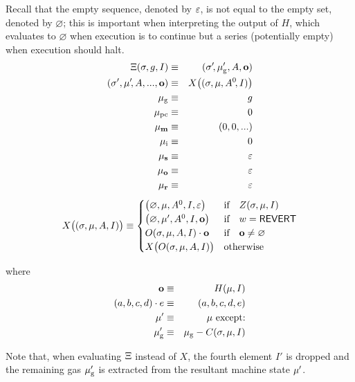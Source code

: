 Recall that the empty sequence, denoted by $\mathbb{\varepsilon}$, is not equal to the empty set, denoted by $\varnothing$; this is important when interpreting the output of $H$, which evaluates to $\varnothing$ when execution is to continue but a series (potentially empty) when execution should halt.
\begin{eqnarray}
\mathrm{\Xi}(\mathbf{\sigma}, g, I) & \equiv & (\mathbf{\sigma}'\!, \mathbf{\mu}'_{\mathrm{g}}, A, \mathbf{o}) \\
(\mathbf{\sigma}', \mathbf{\mu}'\!, A, ..., \mathbf{o}) & \equiv & X\big((\mathbf{\sigma}, \mathbf{\mu}, A^0\!, I)\big) \\
\mathbf{\mu}_{\mathrm{g}} & \equiv & g \\
\mathbf{\mu}_{\mathrm{pc}} & \equiv & 0 \\
\mathbf{\mu}_{\mathbf{m}} & \equiv & (0, 0, ...) \\
\mathbf{\mu}_{\mathrm{i}} & \equiv & 0	\\
\mathbf{\mu}_{\mathbf{s}} & \equiv & \mathbb{\varepsilon} \\
\mathbf{\mu}_{\mathbf{o}} & \equiv & \mathbb{\varepsilon}	\\
\mathbf{\mu}_{\mathbf{r}} & \equiv & \mathbb{\varepsilon}
\end{eqnarray}
\begin{equation} \label{eq:X-def}
X\big( (\mathbf{\sigma}, \mathbf{\mu}, A, I) \big) \equiv \begin{cases}
\big(\varnothing, \mathbf{\mu}, A^0, I, \mathbb{\varepsilon}\big) & \text{if} \quad Z(\mathbf{\sigma}, \mathbf{\mu}, I) \\
\big(\varnothing, \mathbf{\mu}', A^0, I, \mathbf{o}\big) & \text{if} \quad w =  \mathsf{REVERT} \\
O(\mathbf{\sigma}, \mathbf{\mu}, A, I) \cdot \mathbf{o} & \text{if} \quad \mathbf{o} \neq \varnothing \\
X\big(O(\mathbf{\sigma}, \mathbf{\mu}, A, I)\big) & \text{otherwise} \\
\end{cases}
\end{equation}

where
\begin{eqnarray}
\mathbf{o} & \equiv & H(\mathbf{\mu}, I) \\
(a, b, c, d) \cdot e & \equiv & (a, b, c, d, e) \\
\mathbf{\mu}' & \equiv & \mathbf{\mu}\ \text{except:} \\
\mathbf{\mu}'_{\mathrm{g}} & \equiv & \mathbf{\mu}_{\mathrm{g}} - C(\mathbf{\sigma}, \mathbf{\mu}, I)
\end{eqnarray}

Note that, when evaluating $\mathrm{\Xi}$ instead of $X$, 
the fourth element $I'$ is dropped and the remaining gas $\mathbf{\mu}'_{\mathrm{g}}$ is extracted from the resultant machine state $\mathbf{\mu}'$.

